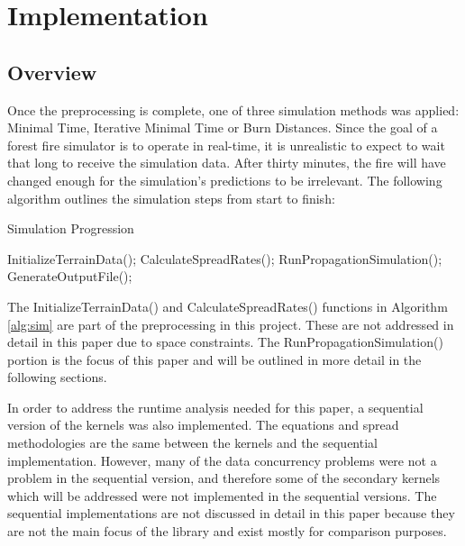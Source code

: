 \chapter{Implementation}
\label{chapter:implementation}

\section{Overview}
Once the preprocessing is complete, one of three simulation methods was applied: Minimal Time, Iterative Minimal Time or Burn Distances. Since the goal of a forest fire simulator is to operate in real-time, it is unrealistic to expect to wait that long to receive the simulation data. After thirty minutes, the fire will have changed enough for the simulation's predictions to be irrelevant. The following algorithm outlines the simulation steps from start to finish:

\begin{algorithm}
  \caption{Simulation Progression}
  \label{alg:sim}
  \begin{algorithmic}
  \STATE InitializeTerrainData();
  \STATE CalculateSpreadRates();
  \STATE RunPropagationSimulation();
  \ENDWHILE  
  \STATE GenerateOutputFile();
  \end{algorithmic}
\end{algorithm}

The InitializeTerrainData() and CalculateSpreadRates() functions in Algorithm \ref{alg:sim} are part of the preprocessing in this project. These are not addressed in detail in this paper due to space constraints. The RunPropagationSimulation() portion is the focus of this paper and will be outlined in more detail in the following sections.

In order to address the runtime analysis needed for this paper, a sequential version of the kernels was also implemented. The equations and spread methodologies are the same between the kernels and the sequential implementation. However, many of the data concurrency problems were not a problem in the sequential version, and therefore some of the secondary kernels which will be addressed were not implemented in the sequential versions. The sequential implementations are not discussed in detail in this paper because they are not the main focus of the library and exist mostly for comparison purposes.  


